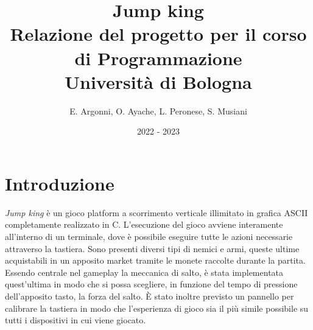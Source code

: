 \documentclass[a4paper]{article}
\title{\textbf{Jump king}\\
\vspace{0.2cm}\normalsize Relazione del progetto per il corso di Programmazione\\
\normalsize Università di Bologna
}
\author{
  E. Argonni,
  O. Ayache,
  L. Peronese,
  S. Musiani
}
\date{2022 - 2023}
\def\CC{{C\nolinebreak[4]\hspace{-.05em}\raisebox{.4ex}{\tiny\bf ++}}}
\begin{document}
\maketitle

\section{Introduzione}
\emph{Jump king} è un gioco platform a scorrimento verticale illimitato 
in grafica ASCII completamente realizzato in \CC. L'esecuzione del gioco 
avviene interamente all'interno di un terminale, dove è possibile eseguire tutte
le azioni necessarie attraverso la tastiera. Sono presenti diversi tipi di 
nemici e armi, queste ultime acquistabili in un apposito market tramite le 
monete raccolte durante la partita. Essendo centrale nel gameplay la meccanica 
di salto, è stata implementata quest'ultima in modo che si possa scegliere, in 
funzione del tempo di pressione dell'apposito tasto, la forza del salto. È stato
inoltre previsto un pannello per calibrare la tastiera in modo che l'esperienza
di gioco sia il più simile possibile su tutti i dispositivi in cui viene 
giocato.
\end{document}
